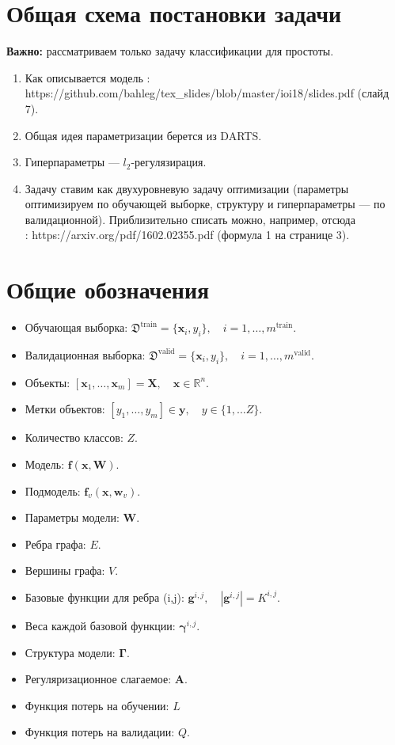 \documentclass[12pt,a4paper]{scrartcl}
\begin{document}
\section{Общая схема постановки задачи}
\textbf{Важно: } рассматриваем только задачу классификации для простоты.
\begin{enumerate}
\item Как описывается модель : https://github.com/bahleg/tex\_slides/blob/master/ioi18/slides.pdf (слайд 7).
\item Общая идея параметризации берется из DARTS.
\item Гиперпараметры --- $l_2$-регулязирация.
\item Задачу ставим как двухуровневую задачу оптимизации (параметры оптимизируем по обучающей выборке, структуру и гиперпараметры --- по валидационной). Приблизительно списать можно, например, отсюда\\: https://arxiv.org/pdf/1602.02355.pdf (формула 1 на странице 3).
\end{enumerate}

\section{Общие обозначения}
\begin{itemize}
\item Обучающая выборка: $\mathfrak{D}^{\text{train}} = \{\mathbf{x}_i, y_i\}, \quad i=1,\dots,m^{\text{train}}$.
\item Валидационная выборка: $\mathfrak{D}^{\text{valid}} = \{\mathbf{x}_i, y_i\}, \quad i=1,\dots,m^{\text{valid}}$.    
\item Объекты: $[\mathbf{x}_1, \dots, \mathbf{x}_m] = \mathbf{X}, \quad \mathbf{x} \in \mathbb{R}^n.$
\item Метки объектов: $[y_1, \dots, y_m] \in \mathbf{y}, \quad y \in \{1, \dots Z\}.$
\item Количество классов: $Z$.
\item Модель: $\mathbf{f}(\mathbf{x}, \mathbf{W}).$
\item Подмодель: $\mathbf{f}_v (\mathbf{x}, \mathbf{w}_v)$.
\item Параметры модели: $\mathbf{W}$.
\item Ребра графа: $E$.
\item Вершины графа: $V$.
\item Базовые функции для ребра (i,j): $\mathbf{g}^{i,j}, \quad |\mathbf{g}^{i,j}| = K^{i,j}.$
\item Веса каждой базовой функции: $\boldsymbol{\gamma}^{i,j}$.
\item Структура модели: $\boldsymbol{\Gamma}$.
\item Регуляризационное слагаемое: $\mathbf{A}$.
\item Функция потерь на обучении: $L$
\item Функция потерь на валидации: $Q$.
\end{itemize}
\end{document}
